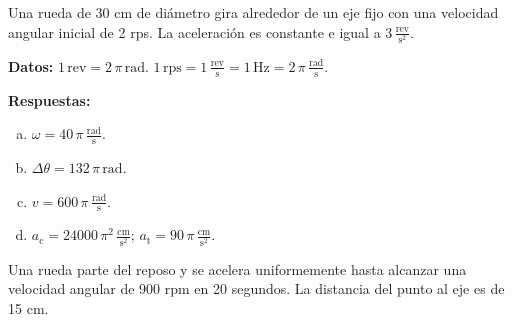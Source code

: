 \documentclass[addpoints]{exam}
\newcommand{\rtas}{\textbf{Respuestas: }}
\begin{document}
\begin{questions}
    \question Una rueda de 30 cm de diámetro gira alrededor de un eje fijo con una velocidad angular inicial de 2 rps. La aceleración es constante e igual a $ 3 \, \frac{\text{rev}}{\text{s}^2}$.

    \textbf{Datos:} $1 \, \text{rev} = 2 \, \pi \, \text{rad}$. $1 \, \text{rps} = 1 \, \frac{\text{rev}}{\text{s}} = 1 \, \text{Hz} = 2 \, \pi \, \frac{\text{rad}}{\text{s}}$.

    \rtas
    \begin{enumerate}[(a)]
        \item $\omega = 40 \, \pi \, \frac{\text{rad}}{\text{s}}$.
        \item $\Delta \theta = 132 \, \pi \, \text{rad}$.
        \item $v = 600 \, \pi \, \frac{\text{rad}}{\text{s}}$.
        \item $a_\text{c} = 24000 \, \pi^2 \, \frac{\text{cm}}{\text{s}^2}$; $a_\text{t} = 90 \, \pi \, \frac{\text{cm}}{\text{s}^2}$.
    \end{enumerate}

    \question Una rueda parte del reposo y se acelera uniformemente hasta alcanzar una velocidad angular de 900 rpm en 20 segundos. La distancia del punto al eje es de 15 cm.
\end{questions}
\end{document}
